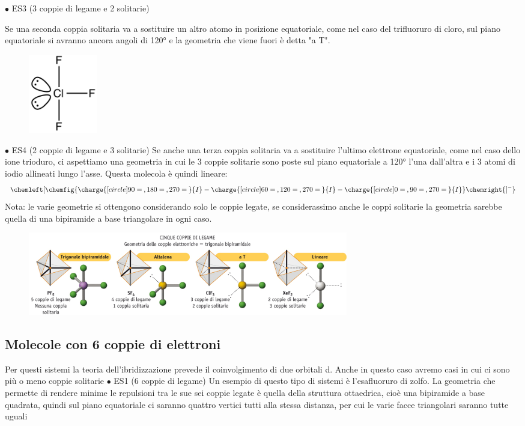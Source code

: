 \newpage

$\bullet$ ES3  (3 coppie di legame e 2 solitarie)

Se una seconda coppia solitaria va a sostituire un altro atomo in posizione equatoriale, come nel caso del trifluoruro di cloro, sul piano equatoriale si avranno ancora angoli di 120° e la geometria che viene fuori è detta "a T".
\begin{figure}[htp]
    \centering
    \includegraphics[width=3cm]{immagini/ClF_3.png}
\end{figure}

$\bullet$ ES4  (2 coppie di legame e 3 solitarie)
Se anche una terza coppia solitaria va a sostituire l'ultimo elettrone equatoriale, come nel caso dello ione trioduro, ci aspettiamo una geometria in cui le 3 coppie solitarie sono poste sul piano equatoriale a 120° l'una dall'altra e i 3 atomi di iodio allineati lungo l'asse. Questa molecola è quindi lineare:
$$
\chemleft[ \chemfig{\charge{[circle]90=\:,180=\:,270=\:}{I}-\charge{[circle]60=\:,120=\:,270=\:}{I}-\charge{[circle]0=\:,90=\:,270=\:}{I}} \chemright{]^{-}}
$$
Nota: le varie geometrie si ottengono considerando solo le coppie legate, se considerassimo anche le coppi solitarie la geometria sarebbe quella di una bipiramide a base triangolare in ogni caso.
\begin{figure}[htp]
    \centering
    \includegraphics[width=14cm]{immagini/geometrie-5-coppie.png}
\end{figure}
\newpage
\subsection{Molecole con 6 coppie di elettroni}
Per questi sistemi la teoria dell'ibridizzazione prevede il coinvolgimento di due orbitali d. Anche in questo caso avremo casi in cui ci sono più o meno coppie solitarie
$\bullet$ ES1  (6 coppie di legame)
Un esempio di questo tipo di sistemi è l'esafluoruro di zolfo. La geometria che permette di rendere minime le repulsioni tra le sue sei coppie legate è quella della struttura ottaedrica, cioè una bipiramide a base quadrata, quindi sul piano equatoriale ci saranno quattro vertici tutti alla stessa distanza, per cui le varie facce triangolari saranno tutte uguali

